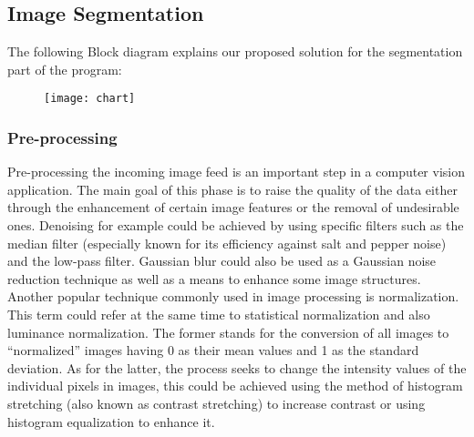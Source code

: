 \subsection{Image Segmentation}
The following Block diagram explains our proposed solution for the segmentation part of the program: 	

\begin{figure}[!h]
	\centering
	\texttt{[image: chart]}
	\label{fig:chart}
\end{figure}
\newpage
\subsubsection{Pre-processing}
Pre-processing the incoming image feed is an important step in a computer vision application. The main goal of this phase is to raise the quality of the data either through the enhancement of certain image features or the removal of undesirable ones. Denoising for example could be achieved by using specific filters such as the median filter (especially known for its efficiency against salt and pepper noise) and the low-pass filter. Gaussian blur could also be used as a Gaussian noise reduction technique as well as a means to enhance some image structures.
\\
Another popular technique commonly used in image processing is normalization. This term could refer at the same time to statistical normalization and also luminance normalization. The former stands for the conversion of all images to “normalized” images having 0 as their mean values and 1 as the standard deviation. As for the latter, the process seeks to change the intensity values of the individual pixels in images, this could be achieved using the method of histogram stretching (also known as contrast stretching) to increase contrast or using histogram equalization to enhance it. 
